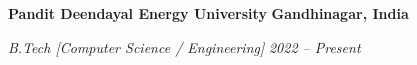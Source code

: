 
\noindent \textbf{Pandit Deendayal Energy University} \hfill \textbf{Gandhinagar, India}\par
\noindent \textit{B.Tech [Computer Science / Engineering]} \hfill \textit{2022 -- Present}\par

